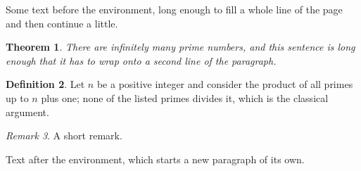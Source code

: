 \documentclass[12pt]{article}
\newtheorem{theorem}{Theorem}
\theoremstyle{definition}
\newtheorem{definition}[theorem]{Definition}
\theoremstyle{remark}
\newtheorem{remark}[theorem]{Remark}
\begin{document}
Some text before the environment, long enough to fill a whole line of the page and then continue a little.
\begin{theorem}
There are infinitely many prime numbers, and this sentence is long enough that it has to wrap onto a second line of the paragraph.
\end{theorem}
\begin{definition}
Let $n$ be a positive integer and consider the product of all primes up to $n$ plus one; none of the listed primes divides it, which is the classical argument.
\end{definition}
\begin{remark}
A short remark.
\end{remark}
Text after the environment, which starts a new paragraph of its own.
\end{document}

